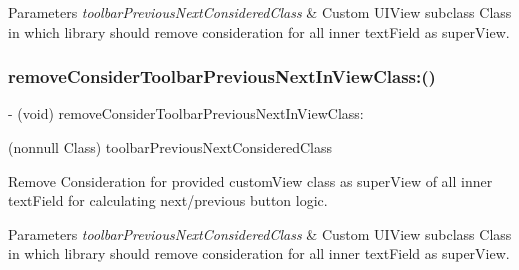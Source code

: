 \begin{DoxyParams}{Parameters}
{\em toolbar\+Previous\+Next\+Considered\+Class} & Custom U\+I\+View subclass Class in which library should remove consideration for all inner text\+Field as super\+View. \\
\hline
\end{DoxyParams}
\mbox{\label{interface_i_q_keyboard_manager_acd8d803c2aaaeab1204c709d81875a26}} 
\subsubsection{\texorpdfstring{remove\+Consider\+Toolbar\+Previous\+Next\+In\+View\+Class\+:()}{removeConsiderToolbarPreviousNextInViewClass:()}\hspace{0.1cm}{\footnotesize\ttfamily [2/3]}}
{\footnotesize\ttfamily -\/ (void) remove\+Consider\+Toolbar\+Previous\+Next\+In\+View\+Class\+: \begin{DoxyParamCaption}\item[{(nonnull Class)}]{toolbar\+Previous\+Next\+Considered\+Class }\end{DoxyParamCaption}}

Remove Consideration for provided custom\+View class as super\+View of all inner text\+Field for calculating next/previous button logic.


\begin{DoxyParams}{Parameters}
{\em toolbar\+Previous\+Next\+Considered\+Class} & Custom U\+I\+View subclass Class in which library should remove consideration for all inner text\+Field as super\+View. \\
\hline
\end{DoxyParams}
\mbox{\label{interface_i_q_keyboard_manager_acd8d803c2aaaeab1204c709d81875a26}} 
